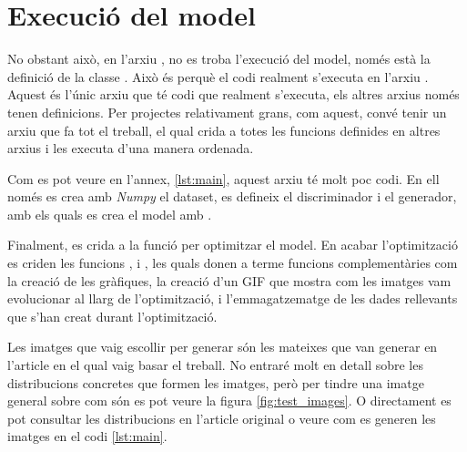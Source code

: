 \section{Execució del model}

No obstant això, en l'arxiu , no es troba l'execució del model, només està la definició de la classe . Això és perquè el codi realment s'executa en l'arxiu . Aquest és l'únic arxiu que té codi que realment s'executa, els altres arxius només tenen definicions. Per projectes relativament grans, com aquest, convé tenir un arxiu que fa tot el treball, el qual crida a totes les funcions definides en altres arxius i les executa d'una manera ordenada. 

Com es pot veure en l'annex, \ref{lst:main}, aquest arxiu té molt poc codi. En ell només es crea amb \textit{Numpy} el dataset, es defineix el discriminador i el generador, amb els quals es crea el model amb . 

Finalment, es crida a la funció  per optimitzar el model. En acabar l'optimització es criden les funcions ,  i , les quals donen a terme funcions complementàries com la creació de les gràfiques, la creació d'un GIF que mostra com les imatges vam evolucionar al llarg de l'optimització, i l'emmagatzematge de les dades rellevants que s'han creat durant l'optimització.

Les imatges que vaig escollir per generar són les mateixes que van generar en l'article en el qual vaig basar el treball. No entraré molt en detall sobre les distribucions concretes que formen les imatges, però per tindre una imatge general sobre com són es pot veure la figura \ref{fig:test_images}. O directament es pot consultar les distribucions en l'article original \cite{QGAN_exp} o veure com es generen les imatges en el codi \ref{lst:main}. 

